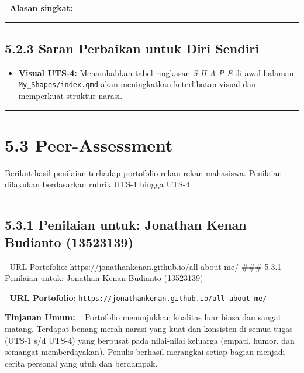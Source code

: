 \documentclass[
  letterpaper,
  DIV=11,
  numbers=noendperiod]{scrreprt}
\providecommand{\tightlist}{%
  \setlength{\itemsep}{0pt}\setlength{\parskip}{0pt}}
\begin{document}
📝 \textbf{Alasan singkat:}

\begin{center}\rule{0.5\linewidth}{0.5pt}\end{center}

\subsection{5.2.3 Saran Perbaikan untuk Diri
Sendiri}\label{saran-perbaikan-untuk-diri-sendiri}

\begin{itemize}
\tightlist
\item
  \textbf{Visual UTS-4:} Menambahkan tabel ringkasan \emph{S-H-A-P-E} di
  awal halaman \texttt{My\_Shapes/index.qmd} akan meningkatkan
  keterlibatan visual dan memperkuat struktur narasi.
\end{itemize}

\begin{center}\rule{0.5\linewidth}{0.5pt}\end{center}

\section{5.3 Peer-Assessment}\label{peer-assessment}

Berikut hasil penilaian terhadap portofolio rekan-rekan mahasiswa.
Penilaian dilakukan berdasarkan rubrik UTS-1 hingga UTS-4.

\begin{center}\rule{0.5\linewidth}{0.5pt}\end{center}

\subsection{5.3.1 Penilaian untuk: Jonathan Kenan Budianto
(13523139)}\label{penilaian-untuk-jonathan-kenan-budianto-13523139}

🔗 URL Portofolio: \url{https://jonathankenan.github.io/all-about-me/}
\#\#\# 5.3.1 Penilaian untuk: Jonathan Kenan Budianto (13523139)

🔗 \textbf{URL Portofolio}:
\texttt{https://jonathankenan.github.io/all-about-me/}

\textbf{Tinjauan Umum:} ~ Portofolio menunjukkan kualitas luar biasa dan
sangat matang. Terdapat benang merah narasi yang kuat dan konsisten di
semua tugas (UTS-1 s/d UTS-4) yang berpusat pada nilai-nilai keluarga
(empati, humor, dan semangat memberdayakan). Penulis berhasil merangkai
setiap bagian menjadi cerita personal yang utuh dan berdampak.
\end{document}
